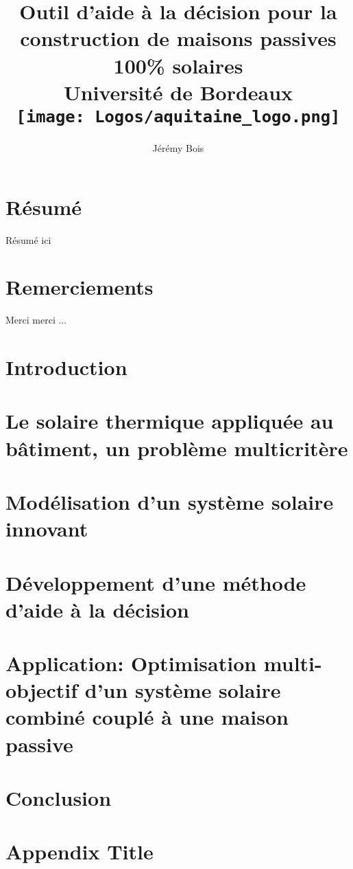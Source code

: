 \documentclass[12pt, oneside]{report}
\title{
    {Outil d’aide à la décision pour la construction de maisons passives 100\% solaires}\\
    {\large Université de Bordeaux}\\
    {\texttt{[image: Logos/aquitaine\_logo.png]}}
}
\author{Jérémy Bois}
\date{}
\theoremstyle{Def}
\begin{document}
\begin{titlepage}
    \maketitle
    \thispagestyle{empty}
\end{titlepage}


\chapter*{Résumé}
Résumé ici

\chapter*{Remerciements}
Merci merci ...


\tableofcontents
\listoffigures
\listoftables
\listofalgorithms
\thispagestyle{empty}
\newpage

\listoftodos[Notes]
\newpage

\chapter*{Introduction}


\chapter{Le solaire thermique appliquée au bâtiment, un problème multicritère}


\chapter{Modélisation d’un système solaire innovant}


\chapter{Développement d’une méthode d’aide à la décision}


\chapter{Application: Optimisation multi-objectif d’un système solaire combiné couplé à une maison passive}


\chapter*{Conclusion}



\newpage
\appendix
\chapter{Appendix Title}



\newpage
\printbibliography
\end{document}
